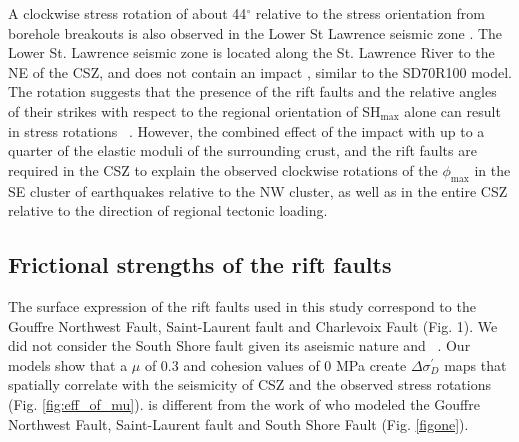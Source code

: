 \documentclass[draft]{agujournal2018}
\begin{document}
A clockwise stress rotation of about 44$^\circ$ relative to the stress orientation from borehole breakouts is also observed in the Lower St Lawrence seismic zone \citep{Mazzotti_2010}. The Lower St. Lawrence seismic zone is located along the St. Lawrence River to the NE of the CSZ, and does not contain an impact , similar to the SD70R100 model. The rotation suggests that the presence of the rift faults and the relative angles of their strikes with respect to the regional orientation of SH$_{\max}$ alone can result in stress rotations ~\citep[e.g.,][]{Zoback_1992}. However, the combined effect of the impact  with up to a quarter of the elastic moduli of the surrounding crust, and the rift faults are required in the CSZ to explain the observed clockwise rotations of the $\phi_{\max}$ in the SE cluster of earthquakes relative to the NW cluster, as well as in the entire CSZ relative to the direction of regional tectonic loading.


\subsection{Frictional strengths of the rift faults}
The surface expression of the rift faults used in this study correspond to the Gouffre Northwest Fault, Saint-Laurent fault and Charlevoix Fault (Fig. 1). We did not consider the South Shore fault given its aseismic nature and ~\citep{lamontagne1999}. Our models show that a $\mu$ of 0.3 and cohesion values of 0 MPa create $\Delta\sigma_{D}^\prime$ maps that spatially correlate with the seismicity of CSZ and the observed stress rotations (Fig. \ref{fig:eff_of_mu}).   %
 is different from the work of \citet{Baird_2010} who modeled the Gouffre Northwest Fault, Saint-Laurent fault and South Shore Fault (Fig. \ref{figone}). 
\end{document}
